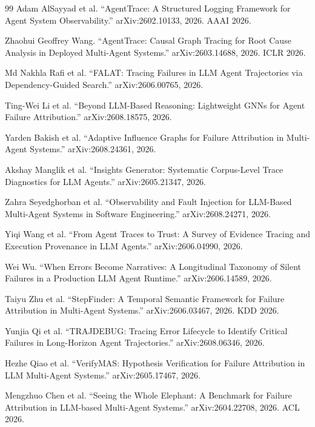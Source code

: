 \documentclass[11pt]{book}
\begin{document}
\begin{thebibliography}{99}
Adam AlSayyad et al.
``AgentTrace: A Structured Logging Framework for Agent System Observability.''
arXiv:2602.10133, 2026. AAAI 2026.

Zhaohui Geoffrey Wang.
``AgentTrace: Causal Graph Tracing for Root Cause Analysis in Deployed Multi-Agent Systems.''
arXiv:2603.14688, 2026. ICLR 2026.

Md Nakhla Rafi et al.
``FALAT: Tracing Failures in LLM Agent Trajectories via Dependency-Guided Search.''
arXiv:2606.00765, 2026.

Ting-Wei Li et al.
``Beyond LLM-Based Reasoning: Lightweight GNNs for Agent Failure Attribution.''
arXiv:2608.18575, 2026.

Yarden Bakish et al.
``Adaptive Influence Graphs for Failure Attribution in Multi-Agent Systems.''
arXiv:2608.24361, 2026.

Akshay Manglik et al.
``Insights Generator: Systematic Corpus-Level Trace Diagnostics for LLM Agents.''
arXiv:2605.21347, 2026.

Zahra Seyedghorban et al.
``Observability and Fault Injection for LLM-Based Multi-Agent Systems in Software Engineering.''
arXiv:2608.24271, 2026.

Yiqi Wang et al.
``From Agent Traces to Trust: A Survey of Evidence Tracing and Execution Provenance in LLM Agents.''
arXiv:2606.04990, 2026.

Wei Wu.
``When Errors Become Narratives: A Longitudinal Taxonomy of Silent Failures in a Production LLM Agent Runtime.''
arXiv:2606.14589, 2026.

Taiyu Zhu et al.
``StepFinder: A Temporal Semantic Framework for Failure Attribution in Multi-Agent Systems.''
arXiv:2606.03467, 2026. KDD 2026.

Yunjia Qi et al.
``TRAJDEBUG: Tracing Error Lifecycle to Identify Critical Failures in Long-Horizon Agent Trajectories.''
arXiv:2608.06346, 2026.

Hezhe Qiao et al.
``VerifyMAS: Hypothesis Verification for Failure Attribution in LLM Multi-Agent Systems.''
arXiv:2605.17467, 2026.

Mengzhuo Chen et al.
``Seeing the Whole Elephant: A Benchmark for Failure Attribution in LLM-based Multi-Agent Systems.''
arXiv:2604.22708, 2026. ACL 2026.
\end{thebibliography}
\end{document}
